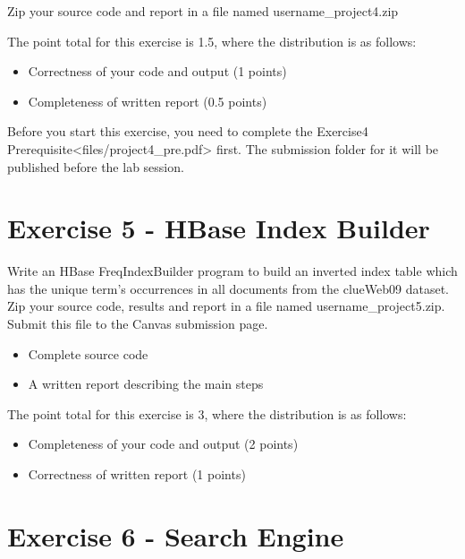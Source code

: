 Zip your source code and report in a file named username\_project4.zip

The point total for this exercise is 1.5, where the distribution is as
follows:

\begin{itemize}
\tightlist
\item
  Correctness of your code and output (1 points)
\item
  Completeness of written report (0.5 points)
\end{itemize}

Before you start this exercise, you need to complete the
Exercise4 Prerequisite\textless{}files/project4\_pre.pdf\textgreater{}
first. The submission folder for it will be published before the lab
session.




\chapter{Exercise 5 - HBase Index Builder}\label{project-5}

Write an HBase FreqIndexBuilder program to build an inverted index table
which has the unique term's occurrences in all documents from the
clueWeb09 dataset. Zip your source code, results and report in a file
named username\_project5.zip. Submit this file to the Canvas submission
page.

\begin{itemize}
\tightlist
\item
  Complete source code
\item
  A written report describing the main steps
\end{itemize}

The point total for this exercise is 3, where the distribution is as
follows:

\begin{itemize}
\tightlist
\item
  Completeness of your code and output (2 points)
\item
  Correctness of written report (1 points)
\end{itemize}



\chapter{Exercise 6 - Search Engine  }\label{project-6}

